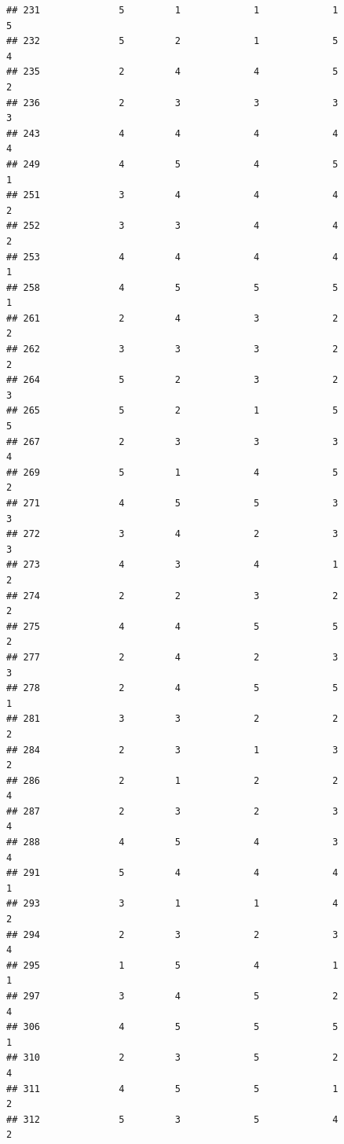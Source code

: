 \documentclass[
]{article}
\begin{document}
\begin{verbatim}
## 231              5         1             1             1           5
## 232              5         2             1             5           4
## 235              2         4             4             5           2
## 236              2         3             3             3           3
## 243              4         4             4             4           4
## 249              4         5             4             5           1
## 251              3         4             4             4           2
## 252              3         3             4             4           2
## 253              4         4             4             4           1
## 258              4         5             5             5           1
## 261              2         4             3             2           2
## 262              3         3             3             2           2
## 264              5         2             3             2           3
## 265              5         2             1             5           5
## 267              2         3             3             3           4
## 269              5         1             4             5           2
## 271              4         5             5             3           3
## 272              3         4             2             3           3
## 273              4         3             4             1           2
## 274              2         2             3             2           2
## 275              4         4             5             5           2
## 277              2         4             2             3           3
## 278              2         4             5             5           1
## 281              3         3             2             2           2
## 284              2         3             1             3           2
## 286              2         1             2             2           4
## 287              2         3             2             3           4
## 288              4         5             4             3           4
## 291              5         4             4             4           1
## 293              3         1             1             4           2
## 294              2         3             2             3           4
## 295              1         5             4             1           1
## 297              3         4             5             2           4
## 306              4         5             5             5           1
## 310              2         3             5             2           4
## 311              4         5             5             1           2
## 312              5         3             5             4           2

\end{verbatim}
\end{document}
